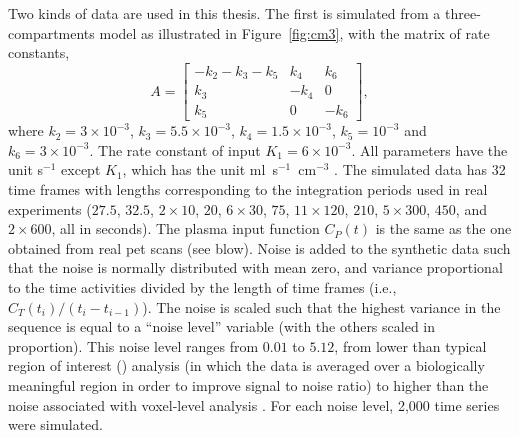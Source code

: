 Two kinds of data are used in this thesis. The first is simulated from a
three-compartments model as illustrated in Figure~\ref{fig:cm3}, with the
matrix of rate constants,
\begin{equation}
  A = \begin{bmatrix}
    - k_2 - k_3 - k_5 & k_4  & k_6 \\
    k_3               & -k_4 & 0   \\
    k_5               & 0    & -k_6
  \end{bmatrix},
\end{equation}
where $k_2 = 3 \times 10^{-3}$, $k_3 = 5.5 \times 10^{-3}$, $k_4 = 1.5 \times
10^{-3}$, $k_5 = 10^{-3}$ and $k_6 = 3 \times 10^{-3}$. The rate constant of
input $K_1 = 6\times 10^{-3}$. All parameters have the unit s$^{-1}$ except
$K_1$, which has the unit ml~s$^{-1}$~cm$^{-3}$ \cite{RLNomen}. The simulated
data has 32 time frames with lengths corresponding to the integration periods
used in real experiments ($27.5$, $32.5$, $2 \times 10$, $20$, $6 \times 30$,
$75$, $11 \times 120$, $210$, $5 \times 300$, $450$, and $2 \times 600$, all
in seconds). The plasma input function $C_P(t)$ is the same as the one
obtained from real pet scans (see blow). Noise is added to the synthetic data
such that the noise is normally distributed with mean zero, and variance
proportional to the time activities divided by the length of time frames
(i.e., $C_T(t_i)/(t_i - t_{i-1})$). The noise is scaled such that the highest
variance in the sequence is equal to a ``noise level'' variable (with the
others scaled in proportion). This noise level ranges from $0.01$ to $5.12$,
from lower than typical region of interest (\roi) analysis (in which the data
is averaged over a biologically meaningful region in order to improve signal
to noise ratio) to higher than the noise associated with voxel-level analysis
\citep{Peng:2008fx}. For each noise level, 2,000 time series were simulated.

